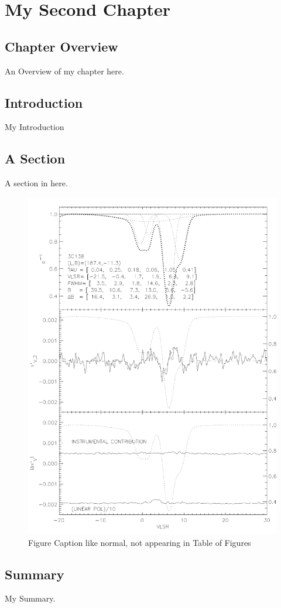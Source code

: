\chapter{My Second Chapter}

\section{Chapter Overview}

An Overview of my chapter here.

\section{Introduction}

My Introduction

\section{A Section}

A section in here.

\begin{figure}
\begin{center}
\includegraphics[scale=.6]{chap2/sample}
\caption[Figure Text to Appear in Table of Figures]{Figure Caption
  like normal, not appearing in Table of Figures}
\end{center}
\end{figure}

\section{Summary }

My Summary.